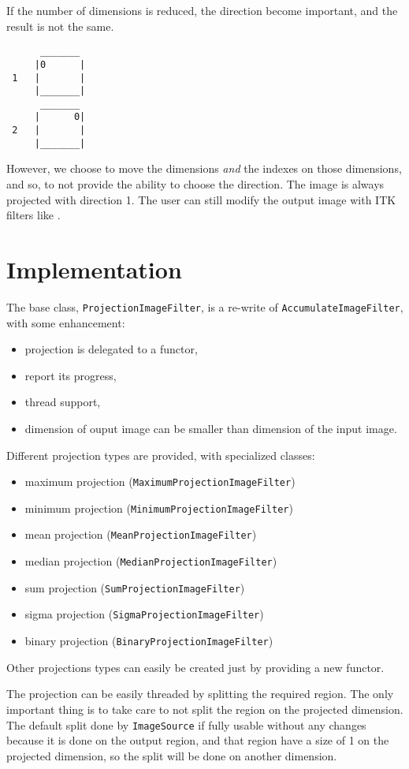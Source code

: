 \documentclass{InsightArticle}
\begin{document}
If the number of dimensions is reduced, the direction become important,
and the result is not the same.
 
\small \begin{verbatim}
      _______
     |0      |
 1   |       |
     |_______|
      _______
     |      0|
 2   |       |
     |_______|
\end{verbatim} \normalsize
 
However, we choose to move the dimensions {\em and} the indexes on those
dimensions, and so, to not provide the ability to choose the direction.
The image is always projected with direction 1.
The user can still modify the output image with ITK filters like
.

\section{Implementation}

The base class, \verb$ProjectionImageFilter$, is a re-write of
\verb$AccumulateImageFilter$, with some enhancement:
\begin{itemize}
  \item projection is delegated to a functor,
  \item report its progress,
  \item thread support,
  \item dimension of ouput image can be smaller than dimension of the input image.
\end{itemize}
Different projection types are provided, with specialized classes:
\begin{itemize}
  \item maximum projection (\verb$MaximumProjectionImageFilter$)
  \item minimum projection (\verb$MinimumProjectionImageFilter$)
  \item mean projection (\verb$MeanProjectionImageFilter$)
  \item median projection (\verb$MedianProjectionImageFilter$)
  \item sum projection (\verb$SumProjectionImageFilter$)
  \item sigma projection (\verb$SigmaProjectionImageFilter$)
  \item binary projection (\verb$BinaryProjectionImageFilter$)
\end{itemize}
Other projections types can easily be created just by providing a new functor.

The projection can be easily threaded by splitting the required region. The
only important thing is to take care to not split the region on the projected
dimension.
The default split done by \verb$ImageSource$ if fully usable without any changes
because it is done on the output region, and that region have a size of 1 on
the projected dimension, so the split will be done on another dimension.
\end{document}
